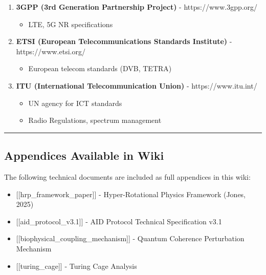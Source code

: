 \begin{enumerate}
\def\labelenumi{\arabic{enumi}.}
\setcounter{enumi}{63}
\tightlist
\item
  \textbf{3GPP (3rd Generation Partnership Project)} -
  https://www.3gpp.org/

  \begin{itemize}
  \tightlist
  \item
    LTE, 5G NR specifications
  \end{itemize}
\item
  \textbf{ETSI (European Telecommunications Standards Institute)} -
  https://www.etsi.org/

  \begin{itemize}
  \tightlist
  \item
    European telecom standards (DVB, TETRA)
  \end{itemize}
\item
  \textbf{ITU (International Telecommunication Union)} -
  https://www.itu.int/

  \begin{itemize}
  \tightlist
  \item
    UN agency for ICT standards
  \item
    Radio Regulations, spectrum management
  \end{itemize}
\end{enumerate}

\begin{center}\rule{0.5\linewidth}{0.5pt}\end{center}

\subsection{\texorpdfstring{ Appendices Available in
Wiki}{ Appendices Available in Wiki}}\label{appendices-available-in-wiki}

The following technical documents are included as full appendices in
this wiki:

\begin{itemize}
\tightlist
\item
  {[}{[}hrp\_framework\_paper{]}{]} - Hyper-Rotational Physics Framework
  (Jones, 2025)
\item
  {[}{[}aid\_protocol\_v3.1{]}{]} - AID Protocol Technical Specification
  v3.1
\item
  {[}{[}biophysical\_coupling\_mechanism{]}{]} - Quantum Coherence
  Perturbation Mechanism
\item
  {[}{[}turing\_cage{]}{]} - Turing Cage Analysis
\end{itemize}

